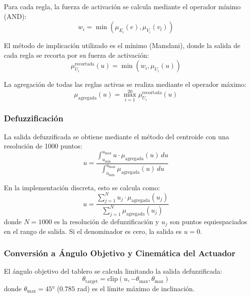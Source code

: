 \documentclass[
A4paper,            1 paper size A4
oneside,            %
openright,          %
10pt,               %
headings=normal,    %
titlepage=on        %
]{article}
\begin{document}
Para cada regla, la fuerza de activación se calcula mediante el operador mínimo (AND):
\begin{equation}
    w_i = \min(\mu_{E_i}(e), \mu_{V_i}(v_l))
\end{equation}

El método de implicación utilizado es el mínimo (Mamdani), donde la salida de cada regla se recorta por su fuerza de activación:
\begin{equation}
    \mu_{U_i}^{\text{recortada}}(u) = \min(w_i, \mu_{U_i}(u))
\end{equation}

La agregación de todas las reglas activas se realiza mediante el operador máximo:
\begin{equation}
    \mu_{\text{agregada}}(u) = \max_{i=1}^{20} \mu_{U_i}^{\text{recortada}}(u)
\end{equation}

\subsubsection{Defuzzificación}
La salida defuzzificada se obtiene mediante el método del centroide con una resolución de 1000 puntos:
\begin{equation}
    u = \frac{\int_{u_{\min}}^{u_{\max}} u \cdot \mu_{\text{agregada}}(u) \, du}{\int_{u_{\min}}^{u_{\max}} \mu_{\text{agregada}}(u) \, du}
\end{equation}

En la implementación discreta, esto se calcula como:
\begin{equation}
    u = \frac{\sum_{j=1}^{N} u_j \cdot \mu_{\text{agregada}}(u_j)}{\sum_{j=1}^{N} \mu_{\text{agregada}}(u_j)}
\end{equation}
donde $N = 1000$ es la resolución de defuzzificación y $u_j$ son puntos equiespaciados en el rango de salida. Si el denominador es cero, la salida es $u = 0$.

\subsubsection{Conversión a Ángulo Objetivo y Cinemática del Actuador}
El ángulo objetivo del tablero se calcula limitando la salida defuzzificada:
\begin{equation}
    \theta_{\text{target}} = \text{clip}(u, -\theta_{\max}, \theta_{\max})
\end{equation}
donde $\theta_{\max} = 45°$ ($0.785$ rad) es el límite máximo de inclinación.
\end{document}
